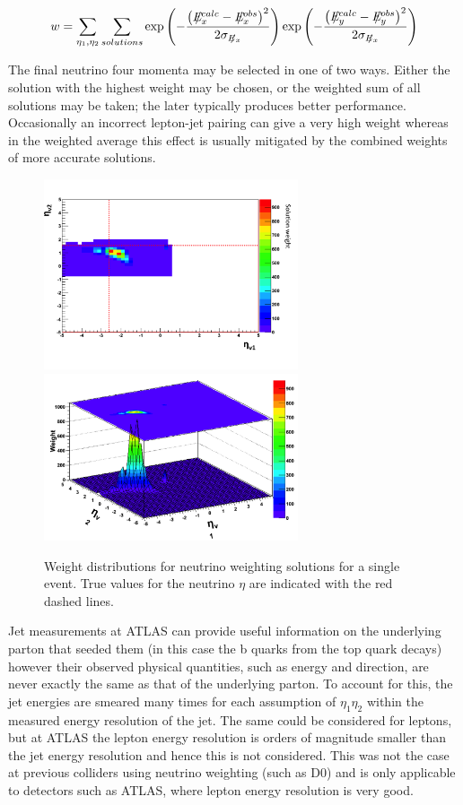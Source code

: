 \begin{equation}
    w=\sum_{\eta_{1},\eta_{2}}\sum_{solutions}    
    \exp\left(-\frac{\left(\metx^{calc}-\metx^{obs} \right)^{2}}{2\sigmet} \right)
    \exp\left(-\frac{\left(\mety^{calc}-\mety^{obs} \right)^{2}}{2\sigmet}
    \right)
    \label{eq:weight}
    \end{equation}
     
The final neutrino four momenta may be selected in one of two ways. Either the solution with the highest weight may be chosen, or the weighted sum of all solutions may be taken; the later typically produces better performance. Occasionally an incorrect lepton-jet pairing can give a very high weight whereas in the weighted average this effect is usually mitigated by the combined weights of more accurate solutions.
     
\begin{figure}[htbp!]
	\begin{center}
	\includegraphics[width=75mm]{f/top_nuweights_1d_2}
	\includegraphics[width=75mm]{f/top_nuweights_2d_2}
	\end{center}
	\caption{Weight distributions for neutrino weighting solutions for a single event. True values for the neutrino $\eta$ are indicated with the red dashed lines.}
	\label{fig:top_nuweights}
\end{figure}

Jet measurements at ATLAS can provide useful information on the underlying parton that seeded them (in this case the b quarks from the top quark decays) however their observed physical quantities, such as energy and direction, are never exactly the same as that of the underlying parton. To account for this, the jet energies are smeared many times for each assumption of $\eta_1\eta_2$ within the measured energy resolution of the jet. The same could be considered for leptons, but at ATLAS the lepton energy resolution is orders of magnitude smaller than the jet energy resolution and hence this is not considered. This was not the case at previous colliders using neutrino weighting (such as D0) and is only applicable to detectors such as ATLAS, where lepton energy resolution is very good.

